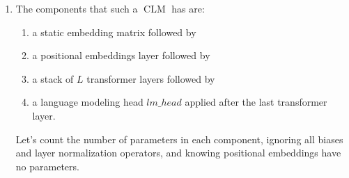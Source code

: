 \documentclass[11pt,a4paper]{article}
\newcommand\op[1]{\operatorname{#1}}
\begin{document}
\begin{enumerate}[label=(\alph*)]
\begin{enumerate}[label=(\roman*)]
                    i.e.\ $\mW^O$, does not change the dimension of its inputs.
          \end{enumerate}
          The first three points above tell us that
          $\mW^O\in\bb{R}^{c\times 12288}$, where $c$ is the size of the
          concatenations of the outputs of each self-attention head, i.e.\
          $c = n\cdot 128$, where $n$ is the number of attention heads we are
          looking for.
          But the fourth point above tells us that $\mW^O$ is a square matrix,
          which means $c = 12288$.
          Thus, we have:
          \begin{align}
              n = \frac{12288}{128} = 96.
          \end{align}
          The largest variant of GPT-3 has $96$ attention heads in each
          multi-head attention operator, and the projection inside the
          multi-head attention indeed does not change the dimension of the
          concatenated outputs of each attention head.
          This means that this projection could be easily dropped from each
          multi-head attention layer without affecting the forward pass in this
          case.
          But this projection is nevertheless still used, likely because the
          large number of parameters is useful for the model.
    \item The components that such a $\op{CLM}$ has are:
          \begin{enumerate}[label=(\roman*)]
              \item a static embedding matrix followed by
              \item a positional embeddings layer followed by
              \item a stack of $L$ transformer layers followed by
              \item a language modeling head $lm\_head$ applied after the last
                    transformer layer.
          \end{enumerate}
          Let's count the number of parameters in each component, ignoring
          all biases and layer normalization operators, and knowing positional
          embeddings have no parameters.


\end{enumerate}
\end{document}
